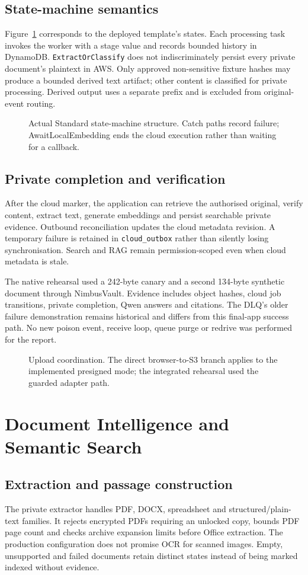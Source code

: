 \documentclass[11pt,a4paper,oneside]{report}
\newcommand{\ShortCaption}[1]{\csname ShortCaption#1\endcsname}
\newcommand{\diagram}[3]{\par\begin{figure}[htbp]\centering\sbox{\DiagramBox}{}\ifdim\wd\DiagramBox>\linewidth\resizebox{\linewidth}{!}{\usebox{\DiagramBox}}\else\usebox{\DiagramBox}\fi\caption[\ShortCaption{#1}]{#2}\label{fig:#3}\end{figure}\par}
\begin{document}
\section{State-machine semantics}
Figure~\ref{fig:asl} corresponds to the deployed template's states. Each processing task invokes the worker with a stage value and records bounded history in DynamoDB. \texttt{ExtractOrClassify} does not indiscriminately persist every private document's plaintext in AWS. Only approved non-sensitive fixture hashes may produce a bounded derived text artifact; other content is classified for private processing. Derived output uses a separate prefix and is excluded from original-event routing.
\diagram{state_machine}{Actual Standard state-machine structure. Catch paths record failure; AwaitLocalEmbedding ends the cloud execution rather than waiting for a callback.}{asl}
\section{Private completion and verification}
After the cloud marker, the application can retrieve the authorised original, verify content, extract text, generate embeddings and persist searchable private evidence. Outbound reconciliation updates the cloud metadata revision. A temporary failure is retained in \texttt{cloud\_outbox} rather than silently losing synchronisation. Search and RAG remain permission-scoped even when cloud metadata is stale.

The native rehearsal used a 242-byte canary and a second 134-byte synthetic document through NimbusVault. Evidence includes object hashes, cloud job transitions, private completion, Qwen answers and citations. The DLQ's older failure demonstration remains historical and differs from this final-app success path. No new poison event, receive loop, queue purge or redrive was performed for the report.
\diagram{upload}{Upload coordination. The direct browser-to-S3 branch applies to the implemented presigned mode; the integrated rehearsal used the guarded adapter path.}{upload}
\FloatBarrier

\chapter{Document Intelligence and Semantic Search}
\section{Extraction and passage construction}
The private extractor handles PDF, DOCX, spreadsheet and structured/plain-text families. It rejects encrypted PDFs requiring an unlocked copy, bounds PDF page count and checks archive expansion limits before Office extraction. The production configuration does not promise OCR for scanned images. Empty, unsupported and failed documents retain distinct states instead of being marked indexed without evidence.
\end{document}

